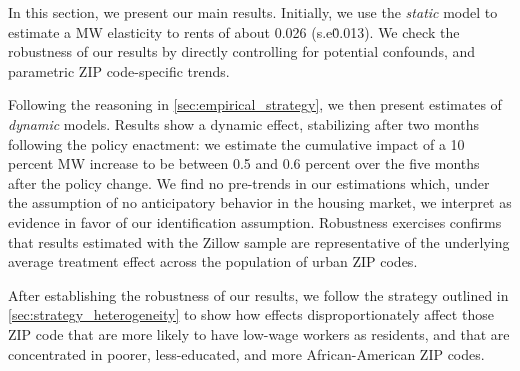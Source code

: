 
In this section, we present our main results. Initially, we use the \textit{static} model
to estimate a MW elasticity to rents of about 0.026 (s.e\. 0.013). We check the robustness 
of our results by directly controlling for potential confounds, and parametric ZIP 
code-specific trends.

Following the reasoning in \autoref{sec:empirical_strategy}, we then present estimates of 
\textit{dynamic} models. Results show a dynamic effect, stabilizing after two
months following the policy enactment: we estimate the cumulative impact of a 10 percent MW 
increase to be between 0.5 and 0.6 percent over the five months after the policy change. 
We find no pre-trends in our estimations which, under the assumption of no anticipatory 
behavior in the housing market, we interpret as evidence in favor of our identification
assumption. Robustness exercises confirms that results estimated with the Zillow sample 
are representative of the underlying average treatment effect across the population of urban
ZIP codes. 






After establishing the robustness of our results, we follow the strategy outlined in 
\autoref{sec:strategy_heterogeneity} to show how effects disproportionately affect those 
ZIP code that are more likely to have low-wage workers as residents, and that are 
concentrated in poorer, less-educated, and more African-American ZIP codes. 

